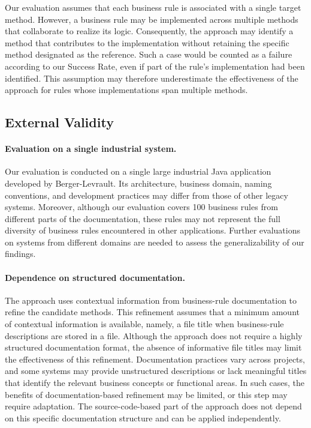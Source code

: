 Our evaluation assumes that each business rule is associated with a single target method. However, a business rule may be implemented across multiple methods that collaborate to realize its logic. Consequently, the approach may identify a method that contributes to the implementation without retaining the specific method designated as the reference. Such a case would be counted as a failure according to our Success Rate, even if part of the rule's implementation had been identified. This assumption may therefore underestimate the effectiveness of the approach for rules whose implementations span multiple methods.

\subsection{External Validity}

\paragraph{Evaluation on a single industrial system.}\noindent

Our evaluation is conducted on a single large industrial Java application developed by Berger-Levrault. Its architecture, business domain, naming conventions, and development practices may differ from those of other legacy systems. Moreover, although our evaluation covers 100 business rules from different parts of the documentation, these rules may not represent the full diversity of business rules encountered in other applications. Further evaluations on systems from different domains are needed to assess the generalizability of our findings.

\paragraph{Dependence on structured documentation.}\noindent

The approach uses contextual information from business-rule documentation to refine the candidate methods. This refinement assumes that a minimum amount of contextual information is available, namely, a file title when business-rule descriptions are stored in a file. Although the approach does not require a highly structured documentation format, the absence of informative file titles may limit the effectiveness of this refinement. Documentation practices vary across projects, and some systems may provide unstructured descriptions or lack meaningful titles that identify the relevant business concepts or functional areas. In such cases, the benefits of documentation-based refinement may be limited, or this step may require adaptation. The source-code-based part of the approach does not depend on this specific documentation structure and can be applied independently.

